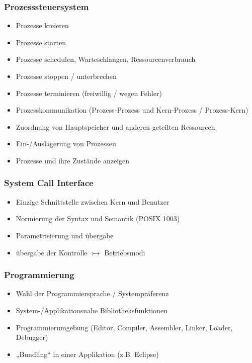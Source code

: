 \documentclass[a4paper, 10pt]{article}
\begin{document}
\subsubsection{Prozesssteuersystem}
\begin{itemize}
\item Prozesse kreieren
\item Prozesse starten
\item Prozesse schedulen, Warteschlangen, Ressourcenverbrauch
\item Prozesse stoppen / unterbrechen
\item Prozesse terminieren (freiwillig / wegen Fehler)
\item Prozesskommunikation (Prozess-Prozess und Kern-Prozess / Prozess-Kern)
\item Zuordnung von Hauptspeicher und anderen geteilten Ressourcen
\item Ein-/Auslagerung von Prozessen
\item Prozesse und ihre Zust\"ande anzeigen
\end{itemize}

\subsubsection{System Call Interface}
\begin{itemize}
\item Einzige Schnittstelle zwischen Kern und Benutzer
\item Normierung der Syntax und Semantik (POSIX 1003)
\item Parametrisierung und \"ubergabe
\item \"ubergabe der Kontrolle $\rightarrowtail$ Betriebsmodi
\end{itemize}

\subsubsection{Programmierung}
\begin{itemize}
\item Wahl der Programmiersprache / Systempr\"aferenz
\item System-/Applikationsnahe Bibliotheksfunktionen
\item Programmierumgebung (Editor, Compiler, Assembler, Linker, Loader, Debugger)
\item „Bundling“ in einer Applikation (z.B. Eclipse)
\end{itemize}
\end{document}
